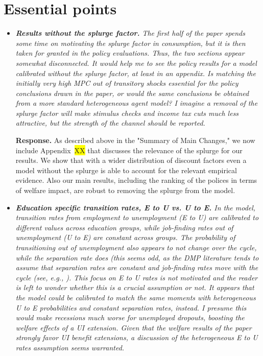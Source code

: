 \documentclass[12pt,letterpaper,english]{article}
\begin{document}
\section{Essential points}
\begin{itemize}
	
	\item \textit{\textbf{Results without the splurge factor.} The first half of the paper spends some time on motivating the splurge factor in consumption, but it is then taken for granted in the policy evaluations. Thus, the two sections appear somewhat disconnected. It would help me to see the policy results for a model calibrated	without the splurge factor, at least in an appendix. Is matching the initially very high MPC out of transitory shocks essential for the policy conclusions drawn in the paper, or would the same conclusions be obtained from a more standard heterogeneous agent model? I imagine a removal of the splurge factor will make stimulus checks and income tax cuts much less attractive, but the strength of the channel should be reported.}
	
	\noindent \textbf{Response.} As described above in the "Summary of Main Changes," we now include Appendix~\colorbox{yellow}{XX} that discusses the relevance of the splurge for our results. We show that with a wider distribution of discount factors even a model without the splurge is able to account for the relevant empirical evidence. Also our main results, including the ranking of the polices in terms of welfare impact, are robust to removing the splurge from the model. 

	\item \textit{\textbf{Education specific transition rates, E to U vs. U to E.} In the model, transition rates from employment to unemployment (E to U) are calibrated to different values across education groups, while job-finding rates out of unemployment (U to E) are constant across groups. The probability of transitioning out of unemployment also appears to not change over the cycle, while the separation rate does (this seems odd, as	the DMP literature tends to assume that separation rates are constant and job-finding rates move with the cycle (see, e.g., \citet{hagedorn2008cyclical}). This focus on E to U	rates is not motivated and the reader is left to wonder whether this is a crucial assumption or not. It appears that the model could be calibrated to match the same moments with heterogeneous U to E probabilities and constant separation rates, instead. I presume this would make recessions much worse for unemployed dropouts, boosting the welfare effects of a UI extension. Given that the welfare results of the paper strongly favor UI benefit extensions, a discussion of the heterogeneous E to U rates assumption seems warranted.}	
	

\end{itemize}
\end{document}
